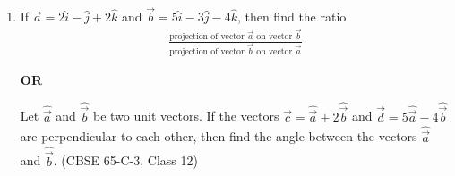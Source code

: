 \begin{enumerate}[label=\thesubsection.\arabic*., ref=\thesubsection.\theenumi]
\solution The equation can be expressed as
\begin{align}
\frac{dy}{dx} = e^{ax+by} = e^{ax}e^{by}
\end{align}
Let $u=e^{-by}$. Then
\begin{align}
\frac{du}{dx} = -be^{-by}\frac{dy}{dx} = -be^{ax}
\end{align}
which is linear. Let $U\brak{s}=\mathcal{L}\cbrak{u}$. From \eqref{eq:c12-lap-der} and \eqref{eq:c12-lap-tab},
\begin{align}
sU-u\brak{0} = -\frac{b}{s-a}
\implies U = \frac{u\brak{0}}{s}-\frac{b}{s\brak{s-a}}
\end{align}
Using \eqref{eq:c12-lap-pf},
\begin{align}
U = \frac{u\brak{0}+\frac{b}{a}}{s}-\frac{b}{a}\cdot\frac{1}{s-a}
\end{align}
From \eqref{eq:c12-lap-tab}, the inverse transform is
\begin{align}
u = e^{-by} = u\brak{0}+\frac{b}{a}-\frac{b}{a}e^{ax}
\end{align}
Dividing by $b$,
\begin{align}
\frac{e^{ax}}{a}+\frac{e^{-by}}{b} = C
\end{align}
where $C=\frac{u\brak{0}}{b}+\frac{1}{a}$ is a constant.
 
The code integrates the original equation using \eqref{eq:c12-euler} and verifies that
$e^{-by}$ matches the Laplace result and that the left hand side stays constant.
 
\begin{center}
\end{center}
 
\item If $\vec{a}=2\hat{i}-\hat{j}+2\hat{k}$ and $\vec{b}=5\hat{i}-3\hat{j}-4\hat{k}$, then find the ratio
\begin{align*}
\frac{\text{projection of vector }\vec{a}\text{ on vector }\vec{b}}
{\text{projection of vector }\vec{b}\text{ on vector }\vec{a}}
\end{align*}
\begin{center}\textbf{OR}\end{center}
Let $\hat{\vec{a}}$ and $\hat{\vec{b}}$ be two unit vectors. If the vectors $\vec{c}=\hat{\vec{a}}+2\hat{\vec{b}}$ and $\vec{d}=5\hat{\vec{a}}-4\hat{\vec{b}}$ are perpendicular to each other, then find the angle between the vectors $\hat{\vec{a}}$ and $\hat{\vec{b}}$.
\hfill (CBSE 65-C-3, Class 12)
 

\end{enumerate}
